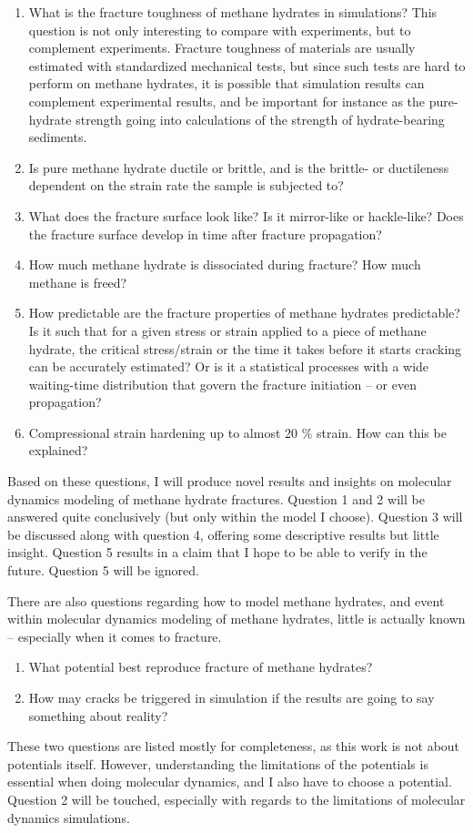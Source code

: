 \begin{enumerate}
\item What is the fracture toughness of methane hydrates in simulations? This question is not only interesting to compare with experiments, but to complement experiments. Fracture toughness of materials are usually estimated with standardized mechanical tests, but since such tests are hard to perform on methane hydrates, it is possible that simulation results can complement experimental results, and be important for instance as the pure-hydrate strength going into calculations of the strength of hydrate-bearing sediments. 
\item Is pure methane hydrate ductile or brittle, and is the brittle- or ductileness dependent on the strain rate the sample is subjected to?
\item What does the fracture surface look like? Is it mirror-like or hackle-like? Does the fracture surface develop in time after fracture propagation?
\item How much methane hydrate is dissociated during fracture? How much methane is freed?
\item How predictable are the fracture properties of methane hydrates predictable? Is it such that for a given stress or strain applied to a piece of methane hydrate, the critical stress/strain or the time it takes before it starts cracking can be accurately estimated? Or is it a statistical processes with a wide waiting-time distribution that govern the fracture initiation -- or even propagation?
\item Compressional strain hardening up to almost 20 \% strain. How can this be explained?
\end{enumerate}
Based on these questions, I will produce novel results and insights on molecular dynamics modeling of methane hydrate fractures. Question 1 and 2 will be answered quite conclusively (but only within the model I choose). Question 3 will be discussed along with question 4, offering some descriptive results but little insight. Question 5 results in a claim that I hope to be able to verify in the future. Question 5 will be ignored.

There are also questions regarding how to model methane hydrates, and event within molecular dynamics modeling of methane hydrates, little is actually known -- especially when it comes to fracture. 

\begin{enumerate}
\item What potential best reproduce fracture of methane hydrates?
\item How may cracks be triggered in simulation if the results are going to say something about reality?
\end{enumerate}
These two questions are listed mostly for completeness, as this work is not about potentials itself. However, understanding the limitations of the potentials is essential when doing molecular dynamics, and I also have to choose a potential. Question 2 will be touched, especially with regards to the limitations of molecular dynamics simulations. 
